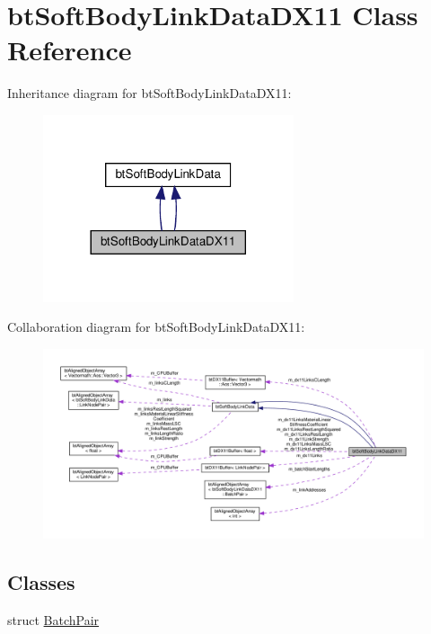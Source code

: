 \hypertarget{classbtSoftBodyLinkDataDX11}{}\section{bt\+Soft\+Body\+Link\+Data\+D\+X11 Class Reference}
\label{classbtSoftBodyLinkDataDX11}


Inheritance diagram for bt\+Soft\+Body\+Link\+Data\+D\+X11\+:
\nopagebreak
\begin{figure}[H]
\begin{center}
\leavevmode
\includegraphics[width=209pt]{classbtSoftBodyLinkDataDX11__inherit__graph}
\end{center}
\end{figure}


Collaboration diagram for bt\+Soft\+Body\+Link\+Data\+D\+X11\+:
\nopagebreak
\begin{figure}[H]
\begin{center}
\leavevmode
\includegraphics[width=350pt]{classbtSoftBodyLinkDataDX11__coll__graph}
\end{center}
\end{figure}
\subsection*{Classes}
\begin{DoxyCompactItemize}
\item 
struct \hyperlink{structbtSoftBodyLinkDataDX11_1_1BatchPair}{Batch\+Pair}
\end{DoxyCompactItemize}
